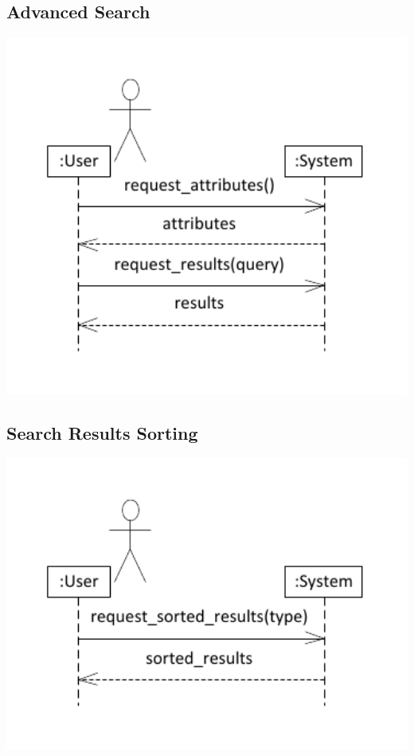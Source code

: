 \documentclass{article}
\begin{document}
\subsection{Advanced Search}
\includegraphics[keepaspectratio, width=6in]{ssd_advanced_search.pdf}\\

\subsection{Search Results Sorting}
\includegraphics[keepaspectratio, width=6in]{ssd_search_result_sorting.pdf}\\
\end{document}
